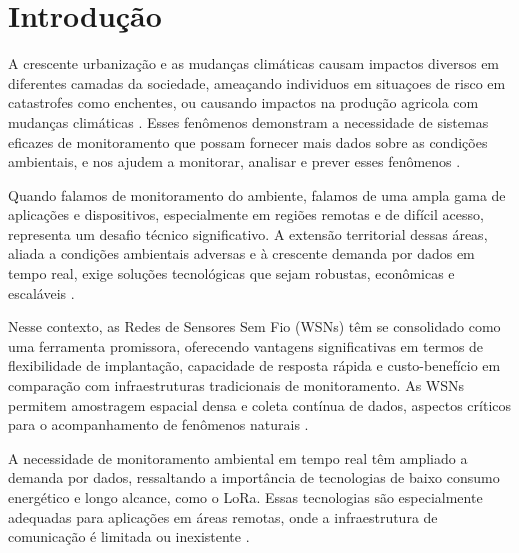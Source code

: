 \chapter{Introdução} \label{cap:intro}

A crescente urbanização e as mudanças climáticas causam impactos diversos em diferentes camadas da sociedade, ameaçando individuos em situaçoes de risco em catastrofes como enchentes, ou causando impactos na produção agricola com mudanças climáticas \cite{jonkman_2005_global, hall_2014_understanding, bragana_2024_anlise, borga_2014_hydrogeomorphic}. Esses fenômenos demonstram a necessidade de sistemas eficazes de monitoramento que possam fornecer mais dados sobre as condições ambientais, e nos ajudem a monitorar, analisar e prever  esses fenômenos \cite{hall_2014_understanding, lin_2020_semantic, lo_2015_visual, iqbal_2021_how}.

Quando falamos de monitoramento do ambiente, falamos de uma ampla gama de aplicações e dispositivos, especialmente em regiões remotas e de difícil acesso, representa um desafio técnico significativo. A extensão territorial dessas áreas, aliada a condições ambientais adversas e à crescente demanda por dados em tempo real, exige soluções tecnológicas que sejam robustas, econômicas e escaláveis \cite{chen_2013_natural, yellampalli_2021_wireless, pule_2017_wireless}.

Nesse contexto, as Redes de Sensores Sem Fio (WSNs) têm se consolidado como uma ferramenta promissora, oferecendo vantagens significativas em termos de flexibilidade de implantação, capacidade de resposta rápida e custo-benefício em comparação com infraestruturas tradicionais de monitoramento. As WSNs permitem amostragem espacial densa e coleta contínua de dados, aspectos críticos para o acompanhamento de fenômenos naturais \cite{chen_2013_natural, ferreira_2023_conception, pule_2017_wireless}.

A necessidade de monitoramento ambiental em tempo real têm ampliado a demanda por dados, ressaltando a importância de tecnologias de baixo consumo energético e longo alcance, como o LoRa. Essas tecnologias são especialmente adequadas para aplicações em áreas remotas, onde a infraestrutura de comunicação é limitada ou inexistente \cite{pule_2017_wireless, chen_2013_natural, ferreira_2023_conception}.

